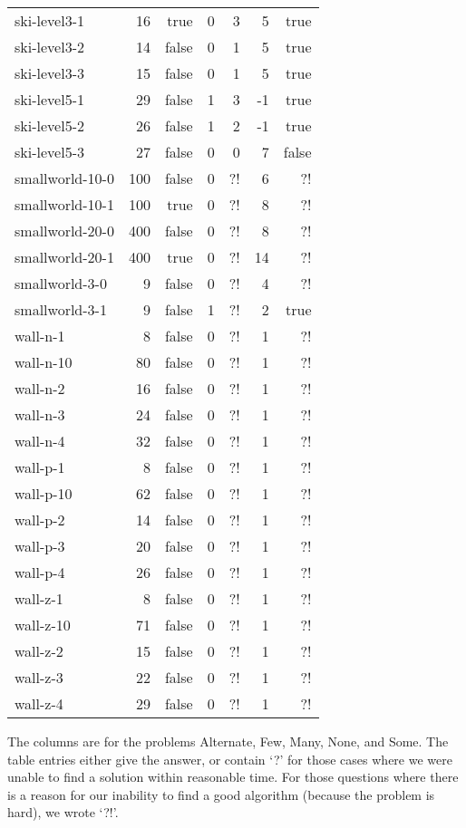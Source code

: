 \documentclass[a4paper]{article}
\begin{document}
\begin{longtable}{lrrrrrr}
	ski-level3-1 & 16 & true & 0 & 3 & 5 & true\\
	ski-level3-2 & 14 & false & 0 & 1 & 5 & true\\
	ski-level3-3 & 15 & false & 0 & 1 & 5 & true\\
	ski-level5-1 & 29 & false & 1 & 3 & -1 & true\\
	ski-level5-2 & 26 & false & 1 & 2 & -1 & true\\
	ski-level5-3 & 27 & false & 0 & 0 & 7 & false\\
	smallworld-10-0 & 100 & false & 0 & ?! & 6 & ?!\\
	smallworld-10-1 & 100 & true & 0 & ?! & 8 & ?!\\
	smallworld-20-0 & 400 & false & 0 & ?! & 8 & ?!\\
	smallworld-20-1 & 400 & true & 0 & ?! & 14 & ?!\\
	smallworld-3-0 & 9 & false & 0 & ?! & 4 & ?!\\
	smallworld-3-1 & 9 & false & 1 & ?! & 2 & true\\
	wall-n-1 & 8 & false & 0 & ?! & 1 & ?!\\
	wall-n-10 & 80 & false & 0 & ?! & 1 & ?!\\
	wall-n-2 & 16 & false & 0 & ?! & 1 & ?!\\
	wall-n-3 & 24 & false & 0 & ?! & 1 & ?!\\
	wall-n-4 & 32 & false & 0 & ?! & 1 & ?!\\
	wall-p-1 & 8 & false & 0 & ?! & 1 & ?!\\
	wall-p-10 & 62 & false & 0 & ?! & 1 & ?!\\
	wall-p-2 & 14 & false & 0 & ?! & 1 & ?!\\
	wall-p-3 & 20 & false & 0 & ?! & 1 & ?!\\
	wall-p-4 & 26 & false & 0 & ?! & 1 & ?!\\
	wall-z-1 & 8 & false & 0 & ?! & 1 & ?!\\
	wall-z-10 & 71 & false & 0 & ?! & 1 & ?!\\
	wall-z-2 & 15 & false & 0 & ?! & 1 & ?!\\
	wall-z-3 & 22 & false & 0 & ?! & 1 & ?!\\
	wall-z-4 & 29 & false & 0 & ?! & 1 & ?!\\

	\bottomrule
\end{longtable}
\medskip

The columns are for the problems Alternate, Few, Many, None, and Some.
The table entries either give the answer, or contain `?' for those cases where we were unable to find a solution within reasonable time.
For those questions where there is a reason for our inability to find a good algorithm (because the problem is hard), we wrote `?!'.
\end{document}
